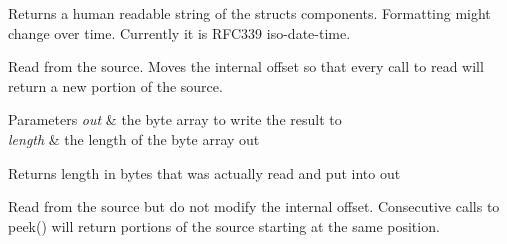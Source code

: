 Returns a human readable string of the struct\textquotesingle{}s components. Formatting might change over time. Currently it is R\+F\+C339 \textquotesingle{}iso-\/date-\/time\textquotesingle{}.

Read from the source. Moves the internal offset so that every call to read will return a new portion of the source.


\begin{DoxyParams}{Parameters}
{\em out} & the byte array to write the result to \\
\hline
{\em length} & the length of the byte array out \\
\hline
\end{DoxyParams}
\begin{DoxyReturn}{Returns}
length in bytes that was actually read and put into out
\end{DoxyReturn}
Read from the source but do not modify the internal offset. Consecutive calls to peek() will return portions of the source starting at the same position.


